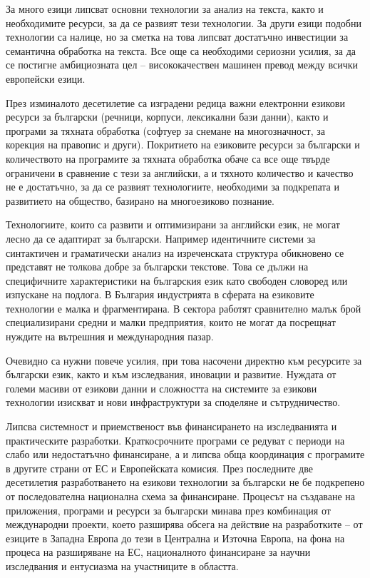 \documentclass[]{../../metanetpaper}
\begin{document}
\begin{multicols}{2}
За много езици липсват основни технологии за анализ на текста, както и
необходимите ресурси, за да се развият тези технологии. За други езици
подобни технологии са налице, но за сметка на това липсват достатъчно
инвестиции за семантична обработка на текста. Все още са необходими
сериозни усилия, за да се постигне амбициозната цел -- висококачествен
машинен превод между всички европейски езици.

През изминалото десетилетие са изградени редица важни електронни
езикови ресурси за български (речници, корпуси, лексикални бази
данни), както и програми за тяхната обработка (софтуер за снемане на
многозначност, за корекция на правопис и други). Покритието на
езиковите ресурси за български и количеството на програмите за тяхната
обработка обаче са все още твърде ограничени в сравнение с тези за
английски, а и тяхното количество и качество не е достатъчно, за да се
развият технологиите, необходими за подкрепата и развитието на общество,
базирано на многоезиково познание.

Технологиите, които са развити и оптимизирани за английски език, не
могат лесно да се адаптират за български. Например идентичните системи
за синтактичен и граматически анализ на изреченската структура
обикновено се представят не толкова добре за български текстове. Това
се дължи на специфичните характеристики на българския език като
свободен словоред или изпускане на подлога.  В България индустрията
в сферата на езиковите технологии е малка и фрагментирана. В сектора
работят сравнително малък брой специализирани средни и малки
предприятия, които не могат да посрещнат нуждите на вътрешния и
международния пазар.

Очевидно са нужни повече усилия, при това насочени директно към
ресурсите за български език, както и към изследвания, иновации и
развитие.  Нуждата от големи масиви от езикови данни и сложността на
системите за езикови технологии изискват и нови инфраструктури за
споделяне и сътрудничество.

Липсва системност и приемственост във финансирането на изследванията и
практическите разработки. Краткосрочните програми се редуват с периоди
на слабо или недостатъчно финансиране, а и липсва обща координация с
програмите в другите страни от ЕС и Европейската комисия.  През
последните две десетилетия разработването на езикови технологии за
български не бе подкрепено от последователна национална схема за
финансиране. Процесът на създаване на приложения, програми и
ресурси за български минава през комбинация от международни проекти,
което разширява обсега на действие на разработките – от езиците в
Западна Европа до тези в Централна и Източна Европа, на фона на
процеса на разширяване на ЕС, националното финансиране за научни
изследвания и ентусиазма на участниците в областта.


\end{multicols}
\end{document}
